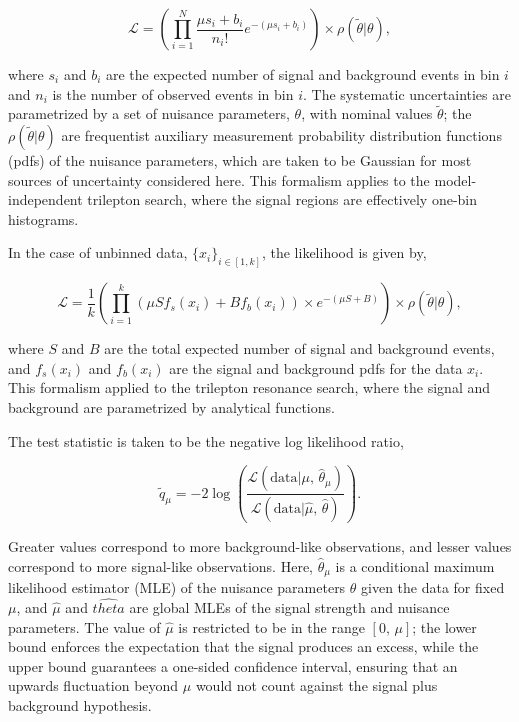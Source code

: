 \begin{appendices}
\begin{equation}\label{eqn:binned-likelihood}
	\mathcal{L} = \left(\prod_{i=1}^N \frac{\mu s_i + b_i}{n_i!} e^{-(\mu s_i + b_i)}\right) \times \rho(\tilde{\theta}|\theta),
\end{equation}

where $s_i$ and $b_i$ are the expected number of signal and background events in bin $i$ and $n_i$ is the number of observed events in bin $i$. The systematic uncertainties are parametrized by a set of nuisance parameters, $\theta$, with nominal values $\tilde{\theta}$; the $\rho(\tilde{\theta}|\theta)$ are frequentist auxiliary measurement probability distribution functions (pdfs) of the nuisance parameters, which are taken to be Gaussian for most sources of uncertainty considered here. This formalism applies to the model-independent trilepton search, where the signal regions are effectively one-bin histograms. 

In the case of unbinned data, $\{x_i\}_{i\in [1,k]}$, the likelihood is given by,

\begin{equation}\label{eqn:unbinned-likelihood}
	\mathcal{L}=\frac1k \left(\prod_{i=1}^{k} \left(\mu S f_s(x_i) + B f_b(x_i)\right) \times e^{-(\mu S + B)}\right) \times \rho(\tilde{\theta}|\theta),
\end{equation}

where $S$ and $B$ are the total expected number of signal and background events, and $f_s(x_i)$ and $f_b(x_i)$ are the signal and background pdfs for the data $x_i$. This formalism applied to the trilepton resonance search, where the signal and background are parametrized by analytical functions. 

The test statistic is taken to be the negative log likelihood ratio,

\begin{equation}\label{eqn:NLLR}
  \tilde{q}_{\mu} = -2\log \left(\frac{\mathcal{L}(\mathrm{data}|\mu,\,\hat{\theta}_{\mu})}{\mathcal{L}(\mathrm{data}|\hat{\mu},\,\hat{\theta})}\right).
\end{equation}

Greater values correspond to more background-like observations, and lesser values correspond to more signal-like observations. Here, $\hat{\theta}_{\mu}$ is a conditional maximum likelihood estimator (MLE) of the nuisance parameters $\theta$ given the data for fixed $\mu$, and $\hat{\mu}$ and $\hat{theta}$ are global MLEs of the signal strength and nuisance parameters. The value of $\hat{\mu}$ is restricted to be in the range $[0,\,\mu]$; the lower bound enforces the expectation that the signal produces an excess, while the upper bound guarantees a one-sided confidence interval, ensuring that an upwards fluctuation beyond $\mu$ would not count against the signal plus background hypothesis. 


\end{appendices}
